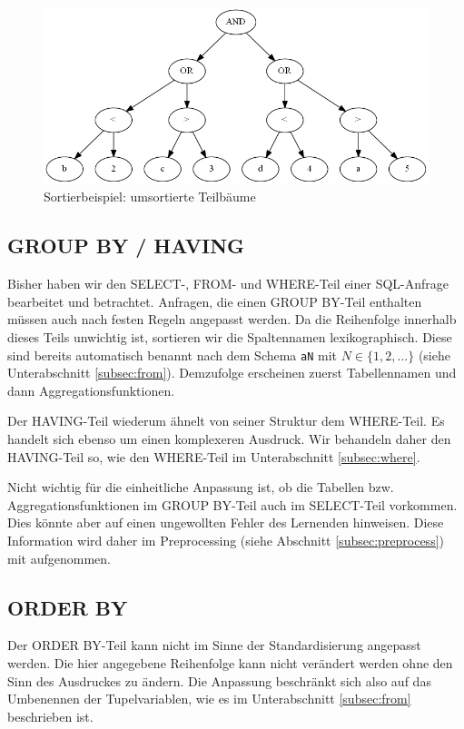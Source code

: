 \begin{figure}
\includegraphics[scale=0.55]{Bilder/sort_exfinb1.png}
\caption{Sortierbeispiel: umsortierte Teilbäume}
\label{fig:sort_exfinb1}
\end{figure}



\subsection{GROUP BY / HAVING}

Bisher haben wir den SELECT-, FROM- und WHERE-Teil einer SQL-Anfrage bearbeitet und betrachtet. Anfragen, die einen GROUP BY-Teil enthalten müssen auch nach festen Regeln angepasst werden. Da die Reihenfolge innerhalb dieses Teils unwichtig ist, sortieren wir die Spaltennamen lexikographisch. Diese sind bereits automatisch benannt nach dem Schema \verb|aN| mit $N\in \{1,2,...\}$ (siehe Unterabschnitt \ref{subsec:from}). Demzufolge erscheinen zuerst Tabellennamen und dann Aggregationsfunktionen.

Der HAVING-Teil wiederum ähnelt von seiner Struktur dem WHERE-Teil. Es handelt sich ebenso um einen komplexeren Ausdruck. Wir behandeln daher den HAVING-Teil so, wie den WHERE-Teil im Unterabschnitt \ref{subsec:where}.

Nicht wichtig für die einheitliche Anpassung ist, ob die Tabellen bzw. Aggregationsfunktionen im GROUP BY-Teil auch im SELECT-Teil vorkommen. Dies könnte aber auf einen ungewollten Fehler des Lernenden hinweisen. Diese Information wird daher im Preprocessing (siehe Abschnitt \ref{subsec:preprocess}) mit aufgenommen. 

\subsection{ORDER BY}

Der ORDER BY-Teil kann nicht im Sinne der Standardisierung angepasst werden. Die hier angegebene Reihenfolge kann nicht verändert werden ohne den Sinn des Ausdruckes zu ändern. Die Anpassung beschränkt sich also auf das Umbenennen der Tupelvariablen, wie es im Unterabschnitt \ref{subsec:from} beschrieben ist.

